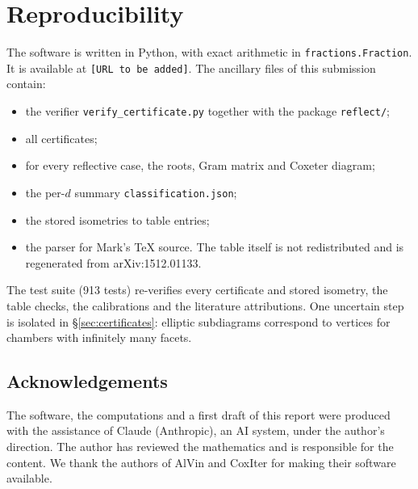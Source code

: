 \documentclass[11pt]{amsart}
\theoremstyle{definition}
\begin{document}
\section{Reproducibility}\label{sec:repro}
The software is written in Python, with exact arithmetic in \texttt{fractions.Fraction}. It
is available at \texttt{[URL to be added]}. The ancillary files of this submission contain:
\begin{itemize}
\item the verifier \texttt{verify\_certificate.py} together with the package \texttt{reflect/};
\item all \NCerts{} certificates;
\item for every reflective case, the roots, Gram matrix and Coxeter diagram;
\item the per-$d$ summary \texttt{classification.json};
\item the stored isometries to table entries;
\item the parser for Mark's \TeX{} source. The table itself is not redistributed and is
  regenerated from arXiv:1512.01133.
\end{itemize}
The test suite (913 tests) re-verifies every certificate and stored isometry, the table
checks, the calibrations and the literature attributions. One uncertain step is isolated in
\S\ref{sec:certificates}: elliptic subdiagrams correspond to vertices for chambers with
infinitely many facets.

\subsection*{Acknowledgements}
The software, the computations and a first draft of this report were produced with the
assistance of Claude (Anthropic), an AI system, under the author's direction. The author has
reviewed the mathematics and is responsible for the content. We thank the authors of AlVin
and CoxIter for making their software available.
\end{document}
